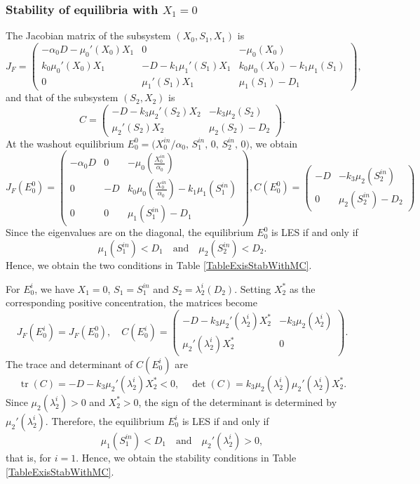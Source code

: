 \documentclass[runningheads]{llncs}
\begin{document}
\subsubsection{Stability of equilibria with $X_1=0$}
The Jacobian matrix of the subsystem $(X_0,S_1,X_1)$ is
\[
J_F =
\begin{pmatrix}
-\alpha_0 D - \mu_0'(X_0) X_1 & 0 & -\mu_0(X_0) \\[1mm]
k_0 \mu_0'(X_0) X_1 & -D - k_1 \mu_1'(S_1) X_1 & k_0 \mu_0(X_0) - k_1 \mu_1(S_1) \\[1mm]
0 & \mu_1'(S_1) X_1 & \mu_1(S_1) - D_1
\end{pmatrix},
\]
and that of the subsystem $(S_2,X_2)$ is
\[
C =
\begin{pmatrix}
- D - k_3 \mu_2'(S_2) X_2 & -k_3 \mu_2(S_2) \\[1mm]
\mu_2'(S_2) X_2 & \mu_2(S_2) - D_2
\end{pmatrix}.
\]
At the washout equilibrium 
$E_0^0 = \big(X_0^{in}/\alpha_0,\, S_1^{in},\, 0,\, S_2^{in},\, 0\big)$,
we obtain
\[
J_F(E_0^0) \!= \!
\begin{pmatrix}
-\alpha_0 D & 0 & -\mu_0(\frac{X_0^{in}}{\alpha_0}) \\[1mm]
0 & -D & k_0 \mu_0(\frac{X_0^{in}}{\alpha_0}) - k_1 \mu_1(S_1^{in}) \\[1mm]
0 & 0 & \mu_1(S_1^{in}) - D_1
\end{pmatrix},
C(E_0^0)  \!= \!
\begin{pmatrix}
- D & -k_3 \mu_2(S_2^{in}) \\[1mm]
0 & \mu_2(S_2^{in}) - D_2
\end{pmatrix}
\]
Since the eigenvalues are on the diagonal, the equilibrium $E_0^0$ is LES if and only if
\[
\mu_1(S_1^{in}) < D_1 \quad \text{and} \quad \mu_2(S_2^{in}) < D_2.
\]
Hence, we obtain the two conditions in Table \ref{TableExisStabWithMC}.

For $E_0^i$, we have $X_1=0$, $S_1=S_1^{in}$ and $S_2 = \lambda_2^i(D_2)$.  
Setting $X_2^*$ as the corresponding positive concentration, the matrices become
\[
J_F(E_0^i) = J_F(E_0^0), \quad
C(E_0^i) =
\begin{pmatrix}
- D - k_3 \mu_2'(\lambda_2^i) X_2^* & - k_3 \mu_2(\lambda_2^i) \\[1mm]
\mu_2'(\lambda_2^i) X_2^* & 0
\end{pmatrix}.
\]
The trace and determinant of $C(E_0^i)$ are
\[
\operatorname{tr}(C) = - D - k_3 \mu_2'(\lambda_2^i) X_2^* < 0, 
\quad
\det(C) = k_3 \mu_2(\lambda_2^i) \mu_2'(\lambda_2^i) X_2^*.
\]
Since $\mu_2(\lambda_2^i)>0$ and $X_2^*>0$, the sign of the determinant is determined by $\mu_2'(\lambda_2^i)$.  
Therefore, the equilibrium $E_0^i$ is LES if and only if
\[
\mu_1(S_1^{in}) < D_1 \quad \text{and} \quad \mu_2'(\lambda_2^i) > 0,
\]
that is, for $i=1$. Hence, we obtain the stability conditions in Table \ref{TableExisStabWithMC}.
\end{document}
